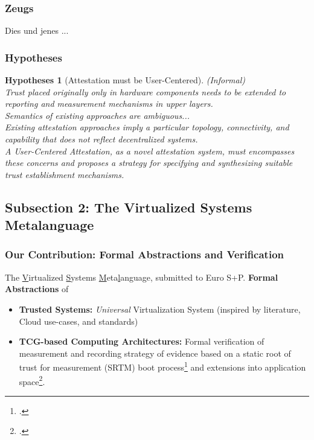 \documentclass[aspectratio=169] {beamer}
\newtheorem{hypotheses}{Hypotheses}
\begin{document}
\begin{frame}[fragile]\frametitle{Zeugs}
  Dies und jenes ...
\end{frame}


\begin{frame}\frametitle{Hypotheses}
\begin{hypotheses}[Attestation must be User-Centered] (Informal)\\
\emph{Trust} placed originally only in hardware components needs to be extended to reporting and measurement mechanisms in upper layers.\\ 


Semantics of existing approaches are ambiguous...\\ 


Existing attestation approaches imply a particular topology, connectivity, and capability that does not reflect decentralized systems.\\ 


A \emph{User-Centered Attestation}, as a novel attestation system, must encompasses these concerns and proposes a strategy for specifying and synthesizing suitable trust establishment mechanisms. 
\end{hypotheses}
\end{frame}

\subsection{Subsection 2: The Virtualized Systems Metalanguage}

\begin{frame}\frametitle{Our Contribution: Formal Abstractions and Verification}
The \uline{V}irtualized \uline{S}ystems \uline{M}eta\uline{l}anguage, submitted to Euro S+P.
\vfill
\textbf{Formal Abstractions} of
\begin{itemize}
	\item \textbf{Trusted Systems:} \emph{Universal} Virtualization System (inspired by literature, Cloud use-cases, and standards)
	\item \textbf{TCG-based Computing Architectures:} Formal verification of measurement and recording strategy of evidence based on a static root of trust for measurement (SRTM) boot process\footcite{Gasser1989,Parno2010,Parno2011} and extensions into application space\footcite{Sailer2004}.
\end{itemize}
\end{frame}
\end{document}
